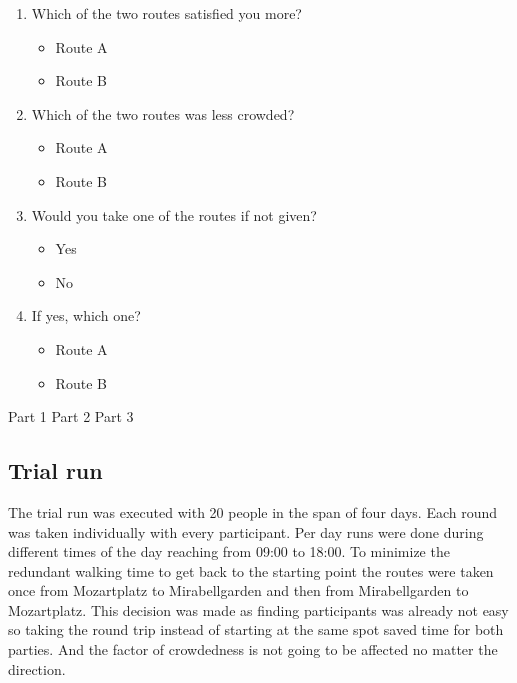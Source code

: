 \begin{enumerate}
    \setcounter{enumi}{\value{surveyCounter}}
    
    \item Which of the two routes satisfied you more?
    \begin{itemize}
        \item Route A
        \item Route B
    \end{itemize}
    
    \item Which of the two routes was less crowded?
    \begin{itemize}
        \item Route A
        \item Route B
    \end{itemize}
    
    \item Would you take one of the routes if not given?
    \begin{itemize}
        \item  Yes
        \item No
    \end{itemize}
    
    \item If yes, which one?
    \begin{itemize}
        \item Route A
        \item Route B
    \end{itemize}
    
    \setcounter{surveyCounter}{\value{enumi}}
\end{enumerate}



Part 1
Part 2
Part 3

\subsection{Trial run}

The trial run was executed with 20 people in the span of four days. Each round was taken individually with every participant. Per day runs were done during different times of the day reaching from 09:00 to 18:00. To minimize the redundant walking time to get back to the starting point the routes were taken once from Mozartplatz to Mirabellgarden and then from Mirabellgarden to Mozartplatz. This decision was made as finding participants was already not easy so taking the round trip instead of starting at the same spot saved time for both parties. And the factor of crowdedness is not going to be affected no matter the direction. 

